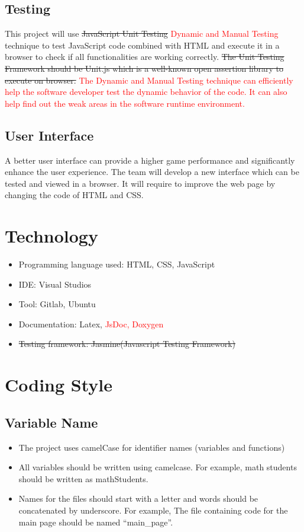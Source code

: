 \documentclass{article}
\begin{document}
\subsection{Testing}
This project will use \sout{JavaScript Unit Testing} \textcolor{red}{Dynamic and Manual Testing} technique to test JavaScript code combined with HTML and execute it in a browser to check if all functionalities are working correctly. \sout{The Unit Testing Framework should be Unit.js which is a well-known open assertion library to execute on browser.} \textcolor{red}{The Dynamic and Manual Testing technique can efficiently help the software developer test the dynamic behavior of the code. It can also help find out the weak areas in the software runtime environment.}
\subsection{User Interface}
A better user interface can provide a higher game performance and significantly enhance the user experience. The team will develop a new interface which can be tested and viewed in a browser. It will require to improve the web page by changing the code of HTML and CSS.





\section{Technology}
\begin{itemize}
  \item Programming language used: HTML, CSS, JavaScript
  \item IDE: Visual Studios
  \item Tool: Gitlab, Ubuntu
  \item Documentation: Latex, \textcolor{red}{JsDoc, Doxygen}
  \item \sout{Testing framework: Jasmine(Javascript Testing Framework)} 
\end{itemize}

\section{Coding Style}
\subsection{Variable Name}
\begin{itemize}
  \item The project uses camelCase for identifier names (variables and functions)
  \item All variables should be written using camelcase. For example, math students should be written as mathStudents.
  \item Names for the files should start with a letter and words should be concatenated by underscore. For example, The file containing code for the main page should be named \enquote{main\_page}.
\end{itemize}
\end{document}
